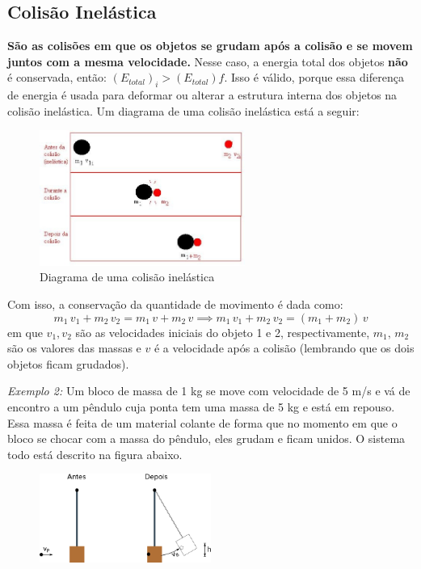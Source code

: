 \documentclass[12pt]{extarticle}
\newcommand{\<}{\langle}
\renewcommand{\>}{\rangle}
\theoremstyle{definition}
\begin{document}
\subsection{Colisão Inelástica}

\textbf{São as colisões em que os objetos se grudam após a colisão e se movem juntos com a mesma velocidade.} Nesse caso, a energia total dos objetos \textbf{não} é conservada, então: $(E_{total})_i > (E_{total}){f}$. Isso é válido, porque essa diferença de energia é usada para deformar ou alterar a estrutura interna dos objetos na colisão inelástica. Um diagrama de uma colisão inelástica está a seguir:
\begin{figure}[H]
    \centering
    \includegraphics[width=0.6\textwidth]{inelastica.jpg}
    \caption{Diagrama de uma colisão inelástica}
    \label{fig:inelastica}
\end{figure}

Com isso, a conservação da quantidade de movimento é dada como:
\begin{equation}\label{eq:inelastic}
    m_1\,v_1 + m_2\,v_2 = m_1\,v + m_2\,v \implies \boxed{m_1\,v_1 + m_2\,v_2 = (m_1+ m_2)\,v}
\end{equation}
\noindent em que $v_1,v_2$ são as velocidades iniciais do objeto 1 e 2, respectivamente, $m_1,\,m_2$ são os valores das massas e $v$ é a velocidade após a colisão (lembrando que os dois objetos ficam grudados).

\textit{Exemplo 2:} Um bloco de massa de 1 kg se move com velocidade de 5 m/s e vá de encontro a um pêndulo cuja ponta tem uma massa de 5 kg e está em repouso. Essa massa é feita de um material colante de forma que no momento em que o bloco se chocar com a massa do pêndulo, eles grudam e ficam unidos. O sistema todo está descrito na figura abaixo.

\begin{figure}[H]
    \centering
    \includegraphics[width=0.5\textwidth]{example_2.png}
    \label{fig:ex_2}
\end{figure}
\end{document}
